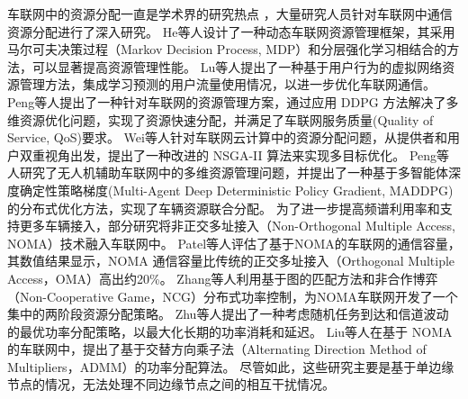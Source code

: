 车联网中的资源分配一直是学术界的研究热点 \cite{noor-a-rahim2022a}，大量研究人员针对车联网中通信资源分配进行了深入研究。
He等人\cite{he2022meta}设计了一种动态车联网资源管理框架，其采用马尔可夫决策过程（Markov Decision Process, MDP）和分层强化学习相结合的方法，可以显著提高资源管理性能。
Lu等人\cite{lu2021user}提出了一种基于用户行为的虚拟网络资源管理方法，集成学习预测的用户流量使用情况，以进一步优化车联网通信。
Peng等人\cite{peng2020deep}提出了一种针对车联网的资源管理方案，通过应用 DDPG 方法解决了多维资源优化问题，实现了资源快速分配，并满足了车联网服务质量(Quality of Service, QoS)要求。
Wei等人\cite{wei2022multi}针对车联网云计算中的资源分配问题，从提供者和用户双重视角出发，提出了一种改进的 NSGA-II 算法来实现多目标优化。
Peng等人\cite{peng2021multi}研究了无人机辅助车联网中的多维资源管理问题，并提出了一种基于多智能体深度确定性策略梯度(Multi-Agent Deep Deterministic Policy Gradient, MADDPG)的分布式优化方法，实现了车辆资源联合分配。
为了进一步提高频谱利用率和支持更多车辆接入，部分研究将非正交多址接入（Non-Orthogonal Multiple Access, NOMA）技术融入车联网中。
Patel等人\cite{patel2021performance}评估了基于NOMA的车联网的通信容量，其数值结果显示，NOMA 通信容量比传统的正交多址接入（Orthogonal Multiple Access，OMA）高出约20\%。
Zhang等人\cite{zhang2021centralized}利用基于图的匹配方法和非合作博弈（Non-Cooperative Game，NCG）分布式功率控制，为NOMA车联网开发了一个集中的两阶段资源分配策略。
Zhu等人\cite{zhu2021decentralized}提出了一种考虑随机任务到达和信道波动的最优功率分配策略，以最大化长期的功率消耗和延迟。
Liu等人\cite{liu2019energy}在基于 NOMA 的车联网中，提出了基于交替方向乘子法（Alternating Direction Method of Multipliers，ADMM）的功率分配算法。
尽管如此，这些研究主要是基于单边缘节点的情况，无法处理不同边缘节点之间的相互干扰情况。

